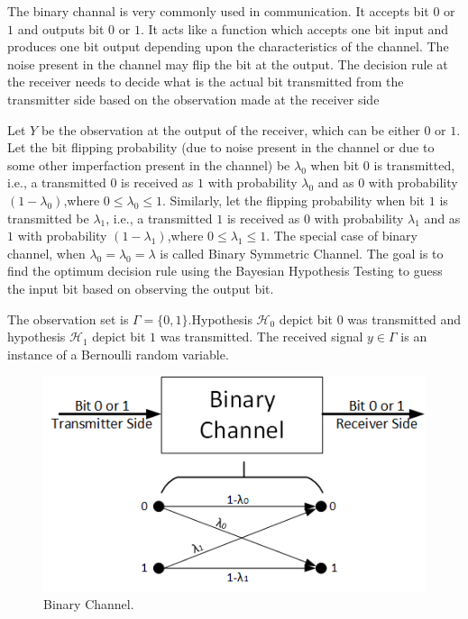 \documentclass[12pt]{report}
\begin{document}
\begin{itemize}
\begin{exmp}
The binary channal is very commonly used in communication. It accepts bit  $0$ or $1$ and outputs bit $0$ or $1$. It acts like a function which accepts one bit input and produces one bit output depending upon the characteristics of the channel. The noise present in the channel may flip the bit at the output. The decision rule at the receiver needs to decide what is the actual bit transmitted from the transmitter side based on the observation made at the receiver side
\par Let $Y$ be the observation at the output of the receiver, which can be either $0$ or $1$. Let the bit flipping probability (due to noise present in the channel or due to some other imperfaction present in the channel) be $\lambda_0$ when bit $0$ is transmitted, i.e., a transmitted $0$ is received as $1$ with probability $\lambda_0$ and as $0$ with probability $(1-\lambda_0)$,where $0 \leq \lambda_0 \leq 1$. Similarly, let the flipping probability when bit $1$ is transmitted be $\lambda_1$, i.e., a transmitted $1$ is received as $0$ with probability $\lambda_1$ and as $1$ with probability $(1-\lambda_1)$,where $0 \leq \lambda_1 \leq 1$. The special case of binary channel, when $\lambda_0 = \lambda_0 = \lambda$ is called Binary Symmetric Channel. The goal is to find the optimum decision rule using the Bayesian Hypothesis Testing to guess the input bit based on observing the output bit.
\par The observation set is $\Gamma=\{0,1\}$.Hypothesis $\mathcal{H}_0$ depict bit $0$ was transmitted and hypothesis $\mathcal{H}_1$ depict bit $1$ was transmitted. The received signal $y\in\Gamma$ is an instance of a Bernoulli random variable.
\begin{figure}[h]
\centering
\includegraphics[scale=0.9]{Figures/BinaryChannel}
\caption{Binary Channel.}

\end{figure}
\end{exmp}
\end{itemize}
\end{document}
